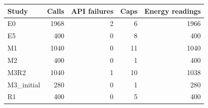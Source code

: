 \begin{tabular}{lrrrr}
\toprule Study & Calls & API failures & Caps & Energy readings \\
\midrule
E0 & 1968 & 2 & 6 & 1966 \\
E5 & 400 & 0 & 8 & 400 \\
M1 & 1040 & 0 & 11 & 1040 \\
M2 & 400 & 0 & 1 & 400 \\
M3R2 & 1040 & 1 & 10 & 1038 \\
M3\_initial & 280 & 0 & 1 & 280 \\
R1 & 400 & 0 & 5 & 400 \\
\bottomrule
\end{tabular}
